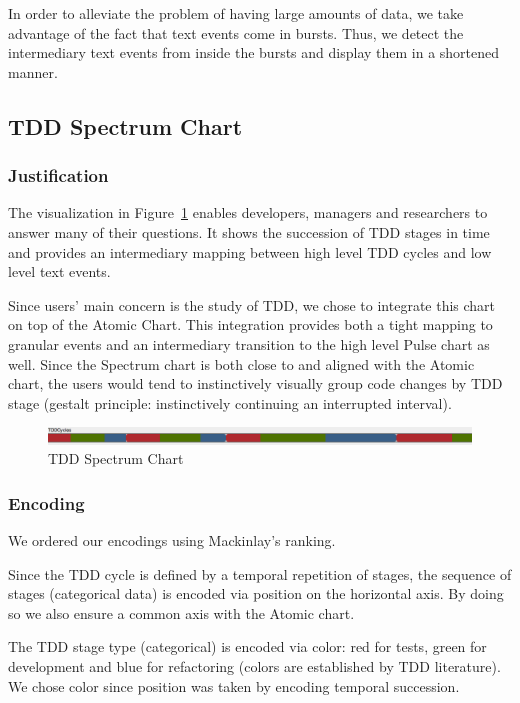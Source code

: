 \documentclass[journal]{vgtc}                %
\begin{document}
In order to alleviate the problem of having large amounts of data, we take advantage of the fact that text events come in bursts.
Thus, we detect the intermediary text events from inside the bursts and display them in a shortened manner.

\subsection{TDD Spectrum Chart}
\label{sec:spectrum}

\subsubsection{Justification}

The visualization in Figure~\ref{fig:two} enables developers, managers and researchers to answer many of their questions. It shows the succession of TDD stages in time and provides an intermediary mapping between high level TDD cycles and low level text events. 

Since users' main concern is the study of TDD, we chose to integrate this chart on top of the Atomic Chart.
This integration provides both a tight mapping to granular events and an intermediary transition to the high level Pulse chart as well.
Since the Spectrum chart is both close to and aligned with the Atomic chart, the users would tend to instinctively visually group code changes by TDD stage (gestalt principle: instinctively continuing an interrupted interval).

\begin{figure}
	\includegraphics[width=\textwidth]{fig2.png}
	\caption{TDD Spectrum Chart}
	\label{fig:two}
\end{figure}

\subsubsection{Encoding}

We ordered our encodings using Mackinlay's ranking.

Since the TDD cycle is defined by a temporal repetition of stages, the sequence of stages (categorical data) is encoded via position on the horizontal axis.
By doing so we also ensure a common axis with the Atomic chart.

The TDD stage type (categorical) is encoded via color: red for tests, green for development and blue for refactoring (colors are established by TDD literature). We chose color since position was taken by encoding temporal succession.
\end{document}
